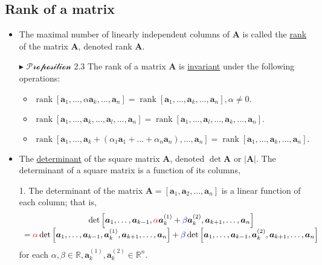 \documentclass[12pt,thmsa]{article}
\begin{document}
\subsection{Rank of a matrix}
\begin{itemize}
	\item The maximal number of linearly independent columns of \(\boldsymbol{A}\) is called the \underline{rank} of the matrix \(\boldsymbol{A}\), denoted rank \(\boldsymbol{A}\).
	
	\item[\(\blacktriangleright\)] \(\mathcal{Proposition}\) 2.3 The rank of a matrix \(\boldsymbol{A}\) is \underline{invariant} under the following operations:
	
	\begin{itemize}
		\item \(\operatorname{rank}\left[\boldsymbol{a}_{1}, \ldots,  \alpha \boldsymbol{a}_{k}, \ldots, \boldsymbol{a}_{n}\right] = \operatorname{rank}\left[\boldsymbol{a}_{1}, \ldots,  \boldsymbol{a}_{k}, \ldots, \boldsymbol{a}_{n}\right],  \alpha \neq 0.\)
		
		\item \(\operatorname{rank}\left[\boldsymbol{a}_{1}, \ldots, \boldsymbol{a}_{k}, \ldots, \boldsymbol{a}_{l}, \ldots, \boldsymbol{a}_{n}\right] = \operatorname{rank}\left[\boldsymbol{a}_{1}, \ldots,  \boldsymbol{a}_{l}, \ldots, \boldsymbol{a}_{k}, \ldots, \boldsymbol{a}_{n}\right]. \)
		
		\item \(\operatorname{rank}\left[\boldsymbol{a}_{1}, \ldots, \boldsymbol{a}_{k} + (\alpha_{1}\boldsymbol{a}_{1} + \ldots + \alpha_{n}\boldsymbol{a}_{n}), \ldots, \boldsymbol{a}_{n}\right] = \operatorname{rank}\left[\boldsymbol{a}_{1}, \ldots,  \boldsymbol{a}_{k}, \ldots, \boldsymbol{a}_{n}\right].\)
	\end{itemize}
	
	\item The \underline{determinant} of the square matrix \(\mathbf{A}\), denoted \( \det \mathbf{A} \) or \( |\mathbf{A}| \). The determinant of a square matrix is a function of its columns,
	
	1. The determinant of the matrix \( \boldsymbol{A}=\left[\boldsymbol{a}_{1}, \boldsymbol{a}_{2}, \ldots, \boldsymbol{a}_{n}\right]\) is a linear function of each column; that is,
	\[
	\begin{array}{c}
		\operatorname{det}\left[\boldsymbol{a}_{1}, \ldots, \boldsymbol{a}_{k-1}, {\color{red}{\alpha}} \boldsymbol{a}_{k}^{(1)}+ {\color{blue}{\beta}} \boldsymbol{a}_{k}^{(2)}, \boldsymbol{a}_{k+1}, \ldots, \boldsymbol{a}_{n}\right] \\
		={\color{red}{\alpha}} \operatorname{det}\left[\boldsymbol{a}_{1}, \ldots, \boldsymbol{a}_{k-1}, \boldsymbol{a}_{k}^{(1)}, \boldsymbol{a}_{k+1}, \ldots, \boldsymbol{a}_{n}\right] 
		+{\color{blue}{\beta}} \operatorname{det}\left[\boldsymbol{a}_{1}, \ldots, \boldsymbol{a}_{k-1}, \boldsymbol{a}_{k}^{(2)}, \boldsymbol{a}_{k+1}, \ldots, \boldsymbol{a}_{n}\right]
	\end{array}
	\]
	for each \( \alpha, \beta \in \mathbb{R}, \boldsymbol{a}_{k}^{(1)}, \boldsymbol{a}_{k}^{(2)} \in \mathbb{R}^{n} \).
	

\end{itemize}
\end{document}
